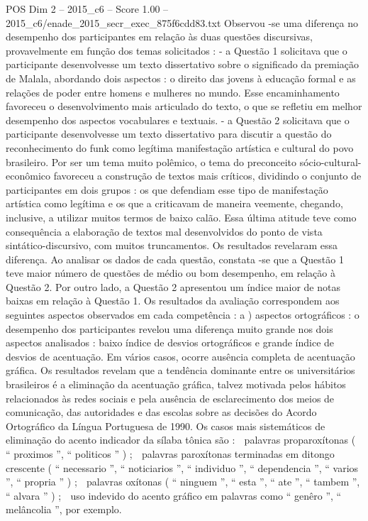 \begin{textsample}{POS Dim 2 – 2015\_c6 – Score 1.00 – 2015\_c6/enade\_2015\_secr\_exec\_875f6cdd83.txt}
Observou -se uma diferença no desempenho dos participantes em relação às duas questões discursivas, provavelmente em função dos temas solicitados : - a Questão 1 solicitava que o participante desenvolvesse um texto dissertativo sobre o significado da premiação de Malala, abordando dois aspectos : o direito das jovens à educação formal e as relações de poder entre homens e mulheres no mundo.
Esse encaminhamento favoreceu o desenvolvimento mais articulado do texto, o que se refletiu em melhor desempenho dos aspectos vocabulares e textuais. - a Questão 2 solicitava que o participante desenvolvesse um texto dissertativo para discutir a questão do reconhecimento do funk como legítima manifestação artística e cultural do povo brasileiro.
Por ser um tema muito polêmico, o tema do preconceito sócio-cultural-econômico favoreceu a construção de textos mais críticos, dividindo o conjunto de participantes em dois grupos : os que defendiam esse tipo de manifestação artística como legítima e os que a criticavam de maneira veemente, chegando, inclusive, a utilizar muitos termos de baixo calão.
Essa última atitude teve como consequência a elaboração de textos mal desenvolvidos do ponto de vista sintático-discursivo, com muitos truncamentos.
Os resultados revelaram essa diferença.
Ao analisar os dados de cada questão, constata -se que a Questão 1 teve maior número de questões de médio ou bom desempenho, em relação à Questão 2.
Por outro lado, a Questão 2 apresentou um índice maior de notas baixas em relação à Questão 1.
Os resultados da avaliação correspondem aos seguintes aspectos observados em cada competência : a ) aspectos ortográficos : o desempenho dos participantes revelou uma diferença muito grande nos dois aspectos analisados : baixo índice de desvios ortográficos e grande índice de desvios de acentuação.
Em vários casos, ocorre ausência completa de acentuação gráfica.
Os resultados revelam que a tendência dominante entre os universitários brasileiros é a eliminação da acentuação gráfica, talvez motivada pelos hábitos relacionados às redes sociais e pela ausência de esclarecimento dos meios de comunicação, das autoridades e das escolas sobre as decisões do Acordo Ortográfico da Língua Portuguesa de 1990.
Os casos mais sistemáticos de eliminação do acento indicador da sílaba tônica são :  palavras proparoxítonas ( “ proximos ”, “ politicos ” ) ;  palavras paroxítonas terminadas em ditongo crescente ( “ necessario ”, “ noticiarios ”, “ individuo ”, “ dependencia ”, “ varios ”, “ propria ” ) ;  palavras oxítonas ( “ ninguem ”, “ esta ”, “ ate ”, “ tambem ”, “ alvara ” ) ;  uso indevido do acento gráfico em palavras como “ genêro ”, “ melâncolia ”, por exemplo.

\end{textsample}
